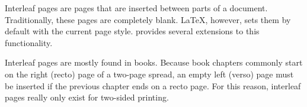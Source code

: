 
Interleaf pages are pages that are inserted between parts of a document. 
Traditionally, these pages are completely blank. \LaTeX{}, however, 
sets them by default with the current page style. \KOMAScript{} provides 
several extensions to this functionality.

Interleaf pages are mostly found in books. Because book chapters commonly
start on the right (recto) page of a two-page spread, an empty left (verso)
page must be inserted if the previous chapter ends on a recto page. For this
reason, interleaf pages really only exist for two-sided printing. 
%
\iffalse %
  The blank versos in one-sided printing are not true interleaf pages,
  although they may appear as such in counting the printed sheets.
\fi%

%

